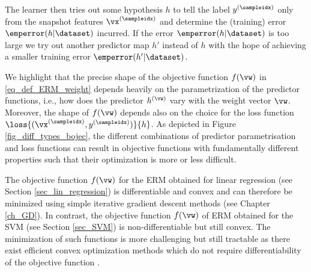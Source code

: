 \documentclass[12pt]{report}
\begin{document}
The learner then tries out some hypothesis $h$ to tell the label $y^{(\sampleidx)}$ 
only from the snapshot features $\vx^{(\sampleidx)}$ and determine the (training) 
error $\emperror(h|\dataset)$ incurred. If the error $\emperror(h|\dataset)$ 
is too large we try out another predictor map $h'$ instead of $h$ with the 
hope of achieving a smaller training error $\emperror(h'|\dataset)$. 

%

We highlight that the precise shape of the objective function $f(\vw)$ in \eqref{eq_def_ERM_weight} 
depends heavily on the parametrization of the predictor functions, i.e., how does the predictor $h^{(\vw)}$ 
vary with the weight vector $\vw$. Moreover, the shape of $f(\vw)$ depends also on the choice 
for the loss function $\loss{(\vx^{(\sampleidx)},y^{(\sampleidx)})}{h}$. As depicted in Figure \ref{fig_diff_types_bojec}, 
the different combinations of predictor parametrisation and loss functions can result in objective 
functions with fundamentally different properties such that their optimization is more or less difficult. 

The objective function $f(\vw)$ for the ERM obtained for linear regression (see Section \ref{sec_lin_regression}) 
is differentiable and convex and can therefore be minimized using simple iterative gradient descent methods 
(see Chapter \ref{ch_GD}). In contrast, the objective function $f(\vw)$ of ERM obtained for the SVM (see Section \ref{sec_SVM}) 
is non-differentiable but still convex. The minimization of such functions is more challenging but still tractable 
as there exist efficient convex optimization methods which do not require differentiability of the objective 
function \cite{ProximalMethods}. 
\end{document}
